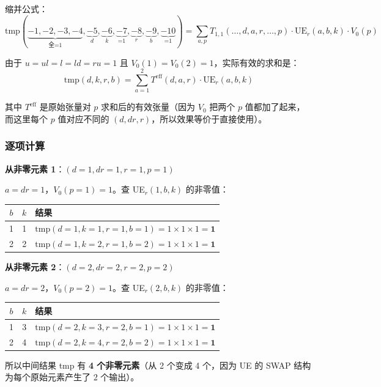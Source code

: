 \documentclass[12pt,a4paper]{article}
\begin{document}
缩并公式：
$$\text{tmp}(\underbrace{-1,-2,-3,-4}_{\text{全=1}}, \underbrace{-5}_{d}, \underbrace{-6}_{k}, \underbrace{-7}_{\text{=1}}, \underbrace{-8}_{r}, \underbrace{-9}_{b}, \underbrace{-10}_{\text{=1}}) = \sum_{a,p} T_{1,1}(\ldots,d,a,r,\ldots,p) \cdot \text{UE}_r(a, b, k) \cdot V_0(p)$$

由于 $u=ul=l=ld=ru=1$ 且 $V_0(1)=V_0(2)=1$，实际有效的求和是：
$$\text{tmp}(d, k, r, b) = \sum_{a=1}^{2} T^{\text{eff}}(d, a, r) \cdot \text{UE}_r(a, b, k)$$

其中 $T^{\text{eff}}$ 是原始张量对 $p$ 求和后的有效张量（因为 $V_0$ 把两个 $p$ 值都加了起来，而这里每个 $p$ 值对应不同的 $(d,dr,r)$，所以效果等价于直接使用）。

\subsubsection{逐项计算}

\textbf{从非零元素 1}：$(d{=}1, dr{=}1, r{=}1, p{=}1)$

$a = dr = 1$，$V_0(p{=}1) = 1$。查 UE$_r(1, b, k)$ 的非零值：

\begin{center}
\begin{tabular}{cc|l}
$b$ & $k$ & 结果 \\
\midrule
1 & 1 & $\text{tmp}(d{=}1, k{=}1, r{=}1, b{=}1) = 1 \times 1 \times 1 = \mathbf{1}$ \\
2 & 2 & $\text{tmp}(d{=}1, k{=}2, r{=}1, b{=}2) = 1 \times 1 \times 1 = \mathbf{1}$ \\
\end{tabular}
\end{center}

\textbf{从非零元素 2}：$(d{=}2, dr{=}2, r{=}2, p{=}2)$

$a = dr = 2$，$V_0(p{=}2) = 1$。查 UE$_r(2, b, k)$ 的非零值：

\begin{center}
\begin{tabular}{cc|l}
$b$ & $k$ & 结果 \\
\midrule
1 & 3 & $\text{tmp}(d{=}2, k{=}3, r{=}2, b{=}1) = 1 \times 1 \times 1 = \mathbf{1}$ \\
2 & 4 & $\text{tmp}(d{=}2, k{=}4, r{=}2, b{=}2) = 1 \times 1 \times 1 = \mathbf{1}$ \\
\end{tabular}
\end{center}

所以中间结果 tmp 有 \textbf{4 个非零元素}（从 2 个变成 4 个，因为 UE 的 SWAP 结构为每个原始元素产生了 2 个输出）。
\end{document}
